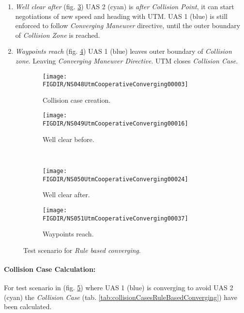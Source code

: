 \begin{enumerate}
    \item \emph{Well clear after} (fig. \ref{fig:ruleBasedConvergingWellClearAfter}) UAS 2 (cyan) is \emph{after Collision Point}, it can start negotiations of new speed and heading with UTM. UAS 1 (blue) is still enforced to follow \emph{Converging Maneuver} directive, until the outer boundary of \emph{Collision Zone} is reached.
    
    \item \emph{Waypoints reach} (fig. \ref{fig:ruleBasedConvergingWaypointsReach})  UAS 1 (blue) leaves outer boundary of \emph{Collision zone}. Leaving \emph{Converging Maneuver Directive}. UTM closes \emph{Collision Case}.
\end{enumerate}


\begin{figure}[H]
    \centering
    \begin{subfigure}{0.48\textwidth}
    	\centering
        \texttt{[image: \\FIGDIR/NS048UtmCooperativeConverging00003]}
        \caption{Collision case creation.}
        \label{fig:ruleBasedConvergingCollisionCaseCreation}
    \end{subfigure}
    \begin{subfigure}{0.48\textwidth}
    	\centering
        \texttt{[image: \\FIGDIR/NS049UtmCooperativeConverging00016]} 
        \caption{Well clear before.}
        \label{fig:ruleBasedConvergingWellClearBefore}
    \end{subfigure}
    \\
    \begin{subfigure}{0.48\textwidth}
    	\centering
        \texttt{[image: \\FIGDIR/NS050UtmCooperativeConverging00024]} 
        \caption{Well clear after.}
        \label{fig:ruleBasedConvergingWellClearAfter}
    \end{subfigure}
    \begin{subfigure}{0.48\textwidth}
    	\centering
        \texttt{[image: \\FIGDIR/NS051UtmCooperativeConverging00037]} 
        \caption{Waypoints reach.}
        \label{fig:ruleBasedConvergingWaypointsReach}
    \end{subfigure}
    \caption{Test scenario for \emph{Rule based converging}. }
    \label{fig:testCaseRuleBasedConverging}
\end{figure}


\paragraph{Collision Case Calculation:} For test scenario in (fig. \ref{fig:testCaseRuleBasedConverging}) where UAS 1 (blue) is converging to avoid UAS 2 (cyan) the \emph{Collision Case} (tab. \ref{tab:collisionCasesRuleBasedConverging}) have been calculated. 

